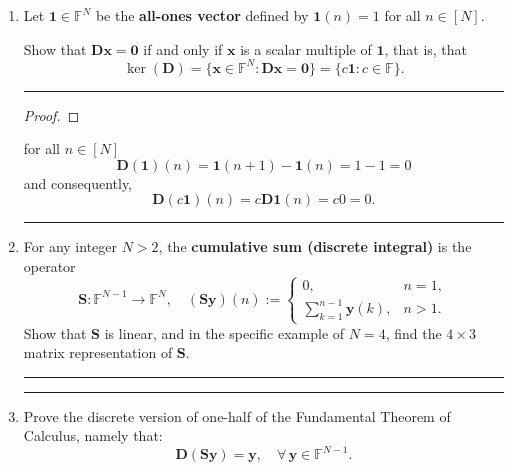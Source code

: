 \documentclass[12pt]{amsart}
\newcommand{\1}{\mathbbm{1}}
\newcounter{Theorem}
\numberwithin{equation}{section}
\numberwithin{Theorem}{section}
\theoremstyle{plain} %
\theoremstyle{definition}
\theoremstyle{remark}
\begin{document}
\begin{enumerate}[1.]
\bigskip
\hrule
\bigskip

\item
Let $\mathbf{1}\in\mathbb{F}^N$ be the \textbf{all-ones vector} defined by $\mathbf{1}(n)=1$ for all $n\in[N]$.

Show that $\mathbf{D}\mathbf{x}=\mathbf{0}$ if and only if $\mathbf{x}$ is a scalar multiple of $\mathbf{1}$, that is, that
\begin{equation*}
\ker(\mathbf{D})
=\{\mathbf{x}\in\mathbb{F}^N: \mathbf{D}\mathbf{x}=\mathbf{0}\}
=\{c\mathbf{1}: c\in\mathbb{F}\}.
\end{equation*}

\bigskip
\hrule
\bigskip

\begin{proof}
	
\end{proof}
for all \(n\in[N]\)
\[ \mathbf{D}(\mathbf{1})(n) = \mathbf{1}(n+1) - \mathbf{1}(n) = 1 - 1 = 0 \]
and consequently,
\[ \mathbf{D}(c\mathbf{1})(n) = c\mathbf{D}\mathbf{1}(n) = c0 = 0. \]

\bigskip
\hrule
\bigskip

\item
For any integer $N>2$, the \textbf{cumulative sum (discrete integral)} is the operator
\begin{equation*}
\mathbf{S}:\mathbb{F}^{N-1}\rightarrow\mathbb{F}^{N},\quad(\mathbf{S}\mathbf{y})(n):=\left\{\begin{array}{cl}0,&n=1,\\\displaystyle\sum_{k=1}^{n-1}\mathbf{y}(k),&n>1.\end{array}\right.
\end{equation*}
Show that $\mathbf{S}$ is linear, and in the specific example of $N=4$, find the $4\times 3$ matrix representation of $\mathbf{S}$.

\bigskip
\hrule
\bigskip

\bigskip
\hrule
\bigskip

\item
Prove the discrete version of one-half of the Fundamental Theorem of Calculus, namely that:
\begin{equation*}
\mathbf{D}(\mathbf{S}\mathbf{y})=\mathbf{y},\quad\forall\,\mathbf{y}\in\mathbb{F}^{N-1}.
\end{equation*}


\end{enumerate}
\end{document}
